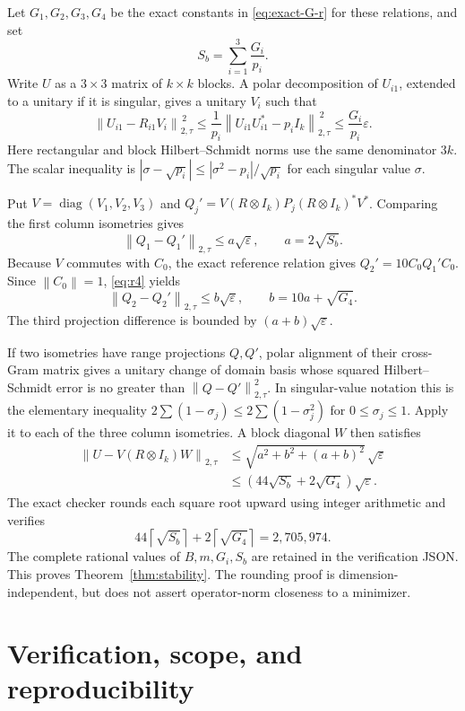 \documentclass[11pt]{article}
\theoremstyle{remark}\newtheorem{remark}[theorem]{Remark}
\newcommand{\diag}{\operatorname{diag}}
\newcommand{\norm}[1]{\left\lVert#1\right\rVert}
\newcommand{\hs}[1]{\left\lVert#1\right\rVert_{2,\tau}}
\begin{document}
Let $G_1,G_2,G_3,G_4$ be the exact constants in \eqref{eq:exact-G-r} for these relations, and set
\[
 S_b=\sum_{i=1}^3\frac{G_i}{p_i}.
\]
Write $U$ as a $3\times3$ matrix of $k\times k$ blocks. A polar decomposition of $U_{i1}$, extended to a unitary if it is singular, gives a unitary $V_i$ such that
\[
 \hs{U_{i1}-R_{i1}V_i}^{\,2}
 \le\frac1{p_i}\hs{U_{i1}U_{i1}^*-p_iI_k}^{\,2}
 \le\frac{G_i}{p_i}\varepsilon.
\]
Here rectangular and block Hilbert--Schmidt norms use the same denominator $3k$. The scalar inequality is $|\sigma-\sqrt{p_i}|\le|\sigma^2-p_i|/\sqrt{p_i}$ for each singular value $\sigma$.

Put $V=\diag(V_1,V_2,V_3)$ and $Q_j'=V(R\otimes I_k)P_j(R\otimes I_k)^*V^*$. Comparing the first column isometries gives
\[
 \hs{Q_1-Q_1'}\le a\sqrt\varepsilon,\qquad a=2\sqrt{S_b}.
\]
Because $V$ commutes with $C_0$, the exact reference relation gives $Q_2'=10C_0Q_1'C_0$. Since $\norm{C_0}=1$, \eqref{eq:r4} yields
\[
 \hs{Q_2-Q_2'}\le b\sqrt\varepsilon,\qquad b=10a+\sqrt{G_4}.
\]
The third projection difference is bounded by $(a+b)\sqrt\varepsilon$.

If two isometries have range projections $Q,Q'$, polar alignment of their cross-Gram matrix gives a unitary change of domain basis whose squared Hilbert--Schmidt error is no greater than $\hs{Q-Q'}^2$. In singular-value notation this is the elementary inequality $2\sum(1-\sigma_j)\le2\sum(1-\sigma_j^2)$ for $0\le\sigma_j\le1$. Apply it to each of the three column isometries. A block diagonal $W$ then satisfies
\begin{align*}
 \hs{U-V(R\otimes I_k)W}
 &\le\sqrt{a^2+b^2+(a+b)^2}\,\sqrt\varepsilon\\
 &\le\left(44\sqrt{S_b}+2\sqrt{G_4}\right)\sqrt\varepsilon.
\end{align*}
The exact checker rounds each square root upward using integer arithmetic and verifies
\[
 44\left\lceil\sqrt{S_b}\right\rceil+2\left\lceil\sqrt{G_4}\right\rceil
 =2{,}705{,}974.
\]
The complete rational values of $B,m,G_i,S_b$ are retained in the verification JSON. This proves Theorem~\ref{thm:stability}. The rounding proof is dimension-independent, but does not assert operator-norm closeness to a minimizer.

\section{Verification, scope, and reproducibility}
\end{document}
